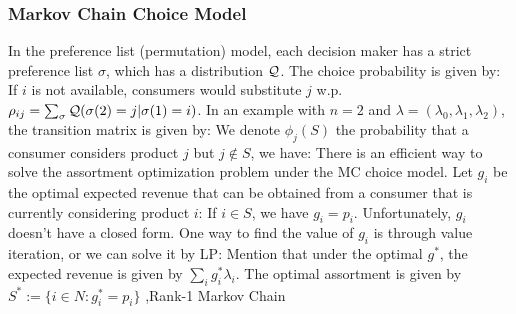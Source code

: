 \documentclass[10pt]{report}
\begin{document}
\subsubsection{Markov Chain Choice Model}
In the preference list (permutation) model, each decision maker has a strict preference list $\sigma$, which has a distribution $\mathcal{Q}$. The choice probability is given by:
If $i$ is not available, consumers would substitute $j$ w.p. $\rho_{ij}=\sum_\sigma \mathcal{Q}(\sigma(2)=j | \sigma(1)=i)$. In an example with $n=2$ and
$\lambda = (\lambda_0, \lambda_1, \lambda_2)$, the transition matrix is given by:
We denote $\phi_j(S)$ the probability that a consumer considers product $j$ but $j\notin S$, we have:
There is an efficient way to solve the assortment optimization problem under the MC choice model. Let $g_i$ be the optimal expected revenue that can be obtained from a consumer that is currently considering product $i$:
If $i\in S$, we have $g_i=p_i$. Unfortunately, $g_i$ doesn't have a closed form. One way to find the value of $g_i$ is through value iteration, or we can solve it by LP:
Mention that under the optimal $g^*$, the expected revenue is given by $\sum_i g_i^* \lambda_i$. The optimal assortment is given by $S^*:=\{i\in N:g_i^*=p_i\}$
\sep{Rank-1 Markov Chain}
\end{document}
